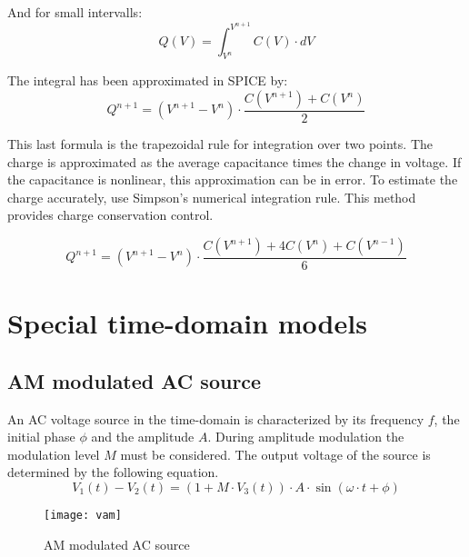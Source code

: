 And for small intervalls:
\begin{equation}
Q(V) = \int^{V^{n+1}}_{V^{n}} C(V)\cdot dV
\end{equation}

The integral has been approximated in SPICE by:
\begin{equation}
Q^{n+1} = \left(V^{n+1} - V^{n}\right)\cdot \dfrac{C(V^{n+1}) + C(V^{n})}{2}
\end{equation}

This last formula is the trapezoidal rule for integration over two
points.  The charge is approximated as the average capacitance times
the change in voltage.  If the capacitance is nonlinear, this
approximation can be in error.  To estimate the charge accurately, use
Simpson's numerical integration rule.  This method provides charge
conservation control.

\begin{equation}
Q^{n+1} = \left(V^{n+1} - V^{n}\right)\cdot \dfrac{C(V^{n+1}) + 4 C(V^{n}) + C(V^{n-1})}{6}
\end{equation}

\section{Special time-domain models}

\subsection{AM modulated AC source}

An AC voltage source in the time-domain is characterized by its
frequency $f$, the initial phase $\phi$ and the amplitude $A$.  During
amplitude modulation the modulation level $M$ must be considered.  The
output voltage of the source is determined by the following equation.
\begin{equation}
V_1\left(t\right) - V_2\left(t\right) = \left(1 + M\cdot V_3\left(t\right)\right)\cdot A\cdot \sin{\left(\omega\cdot t + \phi\right)}
\end{equation}

\begin{figure}[ht]
\begin{center}
\texttt{[image: vam]}
\end{center}
\label{fig:VAM}
\caption{AM modulated AC source}
\end{figure}
\FloatBarrier

